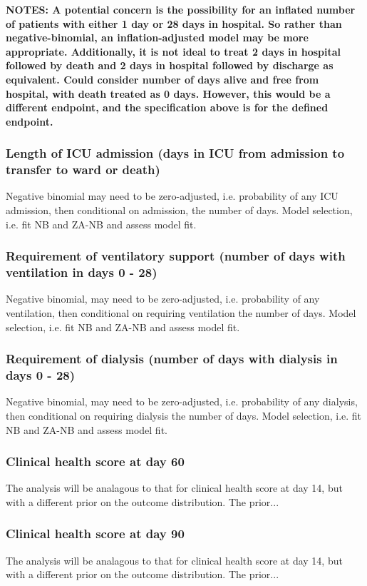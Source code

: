 \documentclass[11pt,parskip=full-]{scrartcl}
\begin{document}
\textbf{NOTES: A potential concern is the possibility for an inflated number of patients with either 1 day or 28 days in hospital. So rather than negative-binomial, an inflation-adjusted model may be more appropriate. Additionally, it is not ideal to treat 2 days in hospital followed by death and 2 days in hospital followed by discharge as equivalent. Could consider number of days alive and free from hospital, with death treated as 0 days. However, this would be a different endpoint, and the specification above is for the defined endpoint.}

\subsubsection{Length of ICU admission (days in ICU from admission to transfer to ward or death)}
Negative binomial may need to be zero-adjusted, i.e. probability of any ICU admission, then conditional on admission, the number of days. Model selection, i.e. fit NB and ZA-NB and assess model fit.

\subsubsection{Requirement of ventilatory support (number of days with ventilation in days 0 - 28)}
Negative binomial, may need to be zero-adjusted, i.e. probability of any ventilation, then conditional on requiring ventilation the number of days. Model selection, i.e. fit NB and ZA-NB and assess model fit.

\subsubsection{Requirement of dialysis (number of days with dialysis in days 0 - 28)}
Negative binomial, may need to be zero-adjusted, i.e. probability of any dialysis, then conditional on requiring dialysis the number of days. Model selection, i.e. fit NB and ZA-NB and assess model fit.

\subsubsection{Clinical health score at day 60}
The analysis will be analagous to that for clinical health score at day 14, but with a different prior on the outcome distribution. The prior...

\subsubsection{Clinical health score at day 90}
The analysis will be analagous to that for clinical health score at day 14, but with a different prior on the outcome distribution. The prior...
\end{document}
